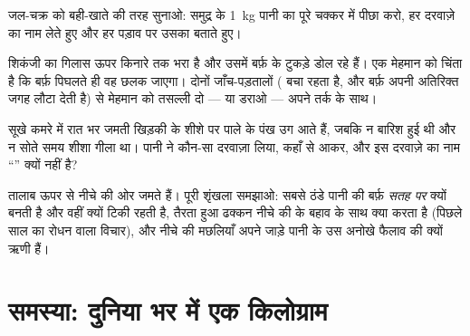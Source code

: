 \begin{exercise}[$\star\star$]\label{exo:g6:water-states:9}
जल-चक्र को बही-खाते की तरह सुनाओ: समुद्र के \qty{1}{kg} पानी का पूरे
चक्कर में पीछा करो, हर दरवाज़े का नाम लेते हुए और हर पड़ाव पर उसका
 बताते हुए।
\end{exercise}

\begin{exercise}[$\star\star$]\label{exo:g6:water-states:10}
शिकंजी का गिलास ऊपर किनारे तक भरा है और उसमें बर्फ़ के टुकड़े डोल रहे
हैं। एक मेहमान को चिंता है कि बर्फ़ पिघलते ही वह छलक जाएगा। दोनों
जाँच-पड़तालों ( बचा रहता है, और बर्फ़ अपनी अतिरिक्त जगह लौटा
देती है) से मेहमान को तसल्ली दो --- या डराओ --- अपने तर्क के साथ।
\end{exercise}

\begin{exercise}[$\star\star$]\label{exo:g6:water-states:11}
सूखे कमरे में रात भर जमती खिड़की के शीशे पर पाले के पंख उग आते हैं,
जबकि न बारिश हुई थी और न सोते समय शीशा गीला था। पानी ने कौन-सा
दरवाज़ा लिया, कहाँ से आकर, और इस दरवाज़े का नाम ``'' क्यों नहीं
है?
\end{exercise}

\begin{exercise}[$\star\star\star$]\label{exo:g6:water-states:12}
तालाब ऊपर से नीचे की ओर जमते हैं। पूरी शृंखला समझाओ: सबसे ठंडे पानी की
बर्फ़ \emph{सतह पर} क्यों बनती है और वहीं क्यों टिकी रहती है, तैरता
हुआ ढक्कन नीचे की  के बहाव के साथ क्या करता है (पिछले साल का
रोधन वाला विचार), और नीचे की मछलियाँ अपने जाड़े पानी के उस अनोखे
फैलाव की क्यों ऋणी हैं।
\end{exercise}

\section{समस्या: दुनिया भर में एक किलोग्राम}

